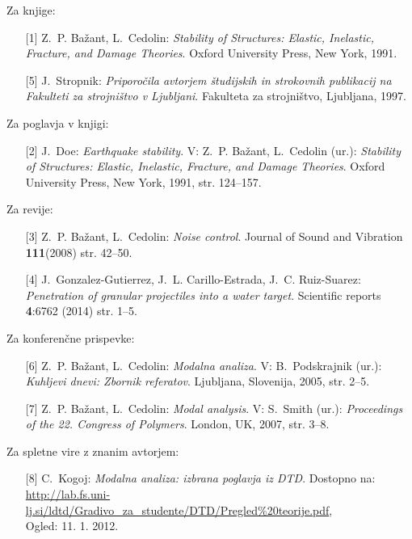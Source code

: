 Za knjige:
\begin{itemize}
\item[{[1]}] Z.~P. Ba\v{z}ant, L.~Cedolin: \emph{Stability of Structures: Elastic,
  Inelastic, Fracture, and Damage Theories}. Oxford University Press, New York,
  1991.
\item[{[5]}] J.~Stropnik: \emph{Priporočila avtorjem študijskih in strokovnih publikacij
  na Fakulteti za strojništvo v Ljubljani}. Fakulteta za strojništvo,
  Ljubljana, 1997.
\end{itemize}

Za poglavja v knjigi:
\begin{itemize}
\item[{[2]}] J.~Doe: \emph{Earthquake stability}. V: Z.~P. Ba\v{z}ant, L.~Cedolin (ur.):
  \emph{Stability of Structures: Elastic, Inelastic, Fracture, and Damage
  Theories}. Oxford University Press, New York, 1991, str. 124--157.
\end{itemize}

Za revije:
\begin{itemize}
\item[{[3]}] Z.~P. Ba\v{z}ant, L.~Cedolin: \emph{Noise control}. Journal of Sound and
  Vibration \textbf{111}(2008) str. 42--50.
\item[{[4]}] J.~Gonzalez-Gutierrez, J.~L. Carillo-Estrada, J.~C. Ruiz-Suarez:
  \emph{Penetration of granular projectiles into a water target}. Scientific
  reports \textbf{4}:6762 (2014) str. 1--5.
\end{itemize}

Za konferenčne prispevke:
\begin{itemize}
\item[{[6]}] Z.~P. Ba\v{z}ant, L.~Cedolin: \emph{Modalna analiza}. V: B.~Podskrajnik (ur.):
  \emph{Kuhljevi dnevi: Zbornik referatov}. Ljubljana, Slovenija, 2005, str.
  2--5.
\item[{[7]}] Z.~P. Ba\v{z}ant, L.~Cedolin: \emph{Modal analysis}. V: S.~Smith (ur.):
  \emph{Proceedings of the 22. Congress of Polymers}. London, UK, 2007, str.
  3--8.
\end{itemize}

Za spletne vire z znanim avtorjem:
\begin{itemize}
\item[{[8]}] C.~Kogoj: \emph{Modalna analiza: izbrana poglavja iz {DTD}}. Dostopno na:
  \url{http://lab.fs.uni-lj.si/ldtd/Gradivo_za_studente/DTD/Pregled\%20teorije.pdf},\\
  Ogled: 11. 1. 2012.
\end{itemize}

